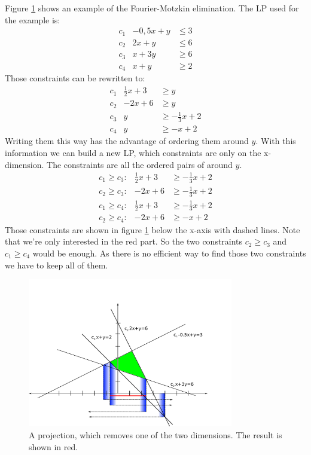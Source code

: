 \begin{Ex}
Figure \ref{Fig:motzkinExample} shows an example of the Fourier-Motzkin elimination. The LP used for the example is:
\begin{eqnarray*}
c_1 & -0,5x + y & \leq 3 \\
c_2 & 2x + y & \leq 6 \\
c_3 & x+3y & \geq 6 \\
c_4 & x+y & \geq 2
\end{eqnarray*}
Those constraints can be rewritten to:
\begin{eqnarray*}
c_1 & \frac{1}{2}x + 3  & \geq y \\
c_2 & -2x+6 & \geq y \\
c_3 & y & \geq -\frac{1}{3}x+2 \\
c_4 & y & \geq -x+2
\end{eqnarray*}
Writing them this way has the advantage of ordering them around $y$. With this information we can build a new LP, which constraints are only on the x-dimension. The constraints are all the ordered pairs of around $y$.
\begin{eqnarray*}
c_1 \geq c_3: & \frac{1}{2}x + 3 & \geq -\frac{1}{3}x+2  \\
c_2 \geq c_3: & -2x+6 &  \geq -\frac{1}{3}x+2 \\
c_1 \geq c_4: & \frac{1}{2}x + 3   & \geq -\frac{1}{3}x+2 \\
c_2 \geq c_4: & -2x+6 & \geq -x+2
\end{eqnarray*}
Those constraints are shown in figure \ref{Fig:motzkinExample} below the x-axis with dashed lines. Note that we're only interested in the red part. So the two constraints $c_2 \geq c_3$ and $c_1 \geq c_4$ would be enough. As there is no efficient way to find those two constraints we have to keep all of them. 

\begin{figure}[hbt]
\begin{center}
\includegraphics[width=0.8\textwidth]{./images/motzkin.pdf} %
\end{center}
\caption{A projection, which removes one of the two dimensions. The result is shown in red.}
\label{Fig:motzkinExample}
\end{figure}
\end{Ex}

